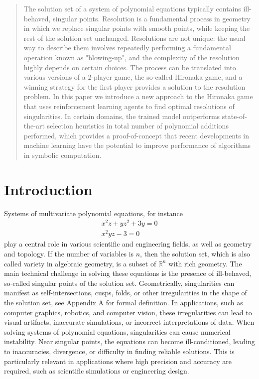 \documentclass{article}
\theoremstyle{plain}
\theoremstyle{definition}
\theoremstyle{remark}
\begin{document}
\begin{abstract}
The solution set of a system of polynomial equations typically contains ill-behaved, singular points. Resolution is a fundamental process in geometry in which we replace singular points with smooth points, while keeping the rest of the solution set unchanged. Resolutions are not unique: the usual way to describe them involves repeatedly performing a fundamental operation known as "blowing-up", and the complexity of the resolution highly depends on certain choices.  The process can be translated into various versions of a 2-player game, the so-called Hironaka game, and a winning strategy for the first  player provides a solution to the resolution problem. In this paper we introduce a new approach to the Hironaka game that uses reinforcement learning agents to find optimal resolutions of singularities.
In certain domains, the trained model outperforms state-of-the-art selection heuristics in total number of polynomial additions performed, which provides a proof-of-concept that recent developments in machine learning have the potential to
improve performance of algorithms in symbolic
computation.
\end{abstract}


\section{Introduction}
Systems of multivariate polynomial equations, for instance
\begin{eqnarray*}
x^2z+yz^2+3y=0 \\ 
x^2yz-3=0
\end{eqnarray*}
play a central role in various scientific and engineering fields, as well
as geometry and topology. If the number of variables is $n$, then the solution set, which is also called variety in algebraic geometry, is a subset of $\mathbb{R}^n$ with rich geometry.  
The main technical challenge in solving these equations is the presence of ill-behaved, so-called singular points of the solution set. Geometrically, singularities can manifest as self-intersections, cusps, folds, or other irregularities in the shape of the solution set, see Appendix A for formal definition.  In applications, such as computer graphics, robotics, and computer vision, these irregularities can lead to visual artifacts, inaccurate simulations, or incorrect interpretations of data. When solving systems of polynomial equations, singularities can cause numerical instability. Near singular points, the equations can become ill-conditioned, leading to inaccuracies, divergence, or difficulty in finding reliable solutions. This is particularly relevant in applications where high precision and accuracy are required, such as scientific simulations or engineering design.
\end{document}
